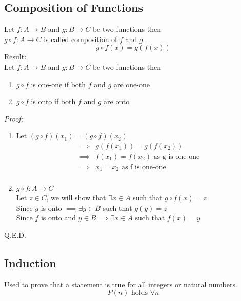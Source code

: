 \documentclass[11pt,letterpaper]{article}
\newenvironment{myproof} 
        {\textit{Proof:}}                                   
        {\begin{flushright} Q.E.D. \end{flushright}}
\begin{document}
\subsection{Composition of Functions}
Let $f:A\to B$ and $g:B\to C$ be two functions then\\
$g\circ f: A\to C$ is called composition of $f$ and $g$.
\[
  g\circ f(x) = g(f(x))
\]
Result:\\
Let $ f:A\to B$ and $g:B\to C$ be two functions then
\begin{enumerate}
  \item $g\circ f$ is one-one if both $f$ and $g$ are one-one
  \item $g\circ f$ is onto if both $f$ and $g$ are onto
\end{enumerate}
\begin{myproof}
  \begin{enumerate}
    \item Let $(g\circ f)(x_1) = (g\circ f)(x_2)$
      \begin{align*}
        \implies & g(f(x_1)) = g(f(x_2)) \\ 
        \implies & f(x_1) = f(x_2) \text{ as g is one-one}\\ 
        \implies & x_1 = x_2 \text{ as f is one-one}\\
      \end{align*}
    \item $g\circ f: A \to C$ \\
      Let $z\in C$, we will show that $\exists x\in A$ such that $g\circ f(x) = z$\\
      Since $g$ is onto $\implies \exists y\in B$ such that $g(y) = z$\\
      Since $f$ is onto and $y\in B \implies \exists x \in A \text{ such that } f(x)=y$ 
  \end{enumerate}
\end{myproof}
\subsection{Induction}
Used to prove that a statement is true for all integers or natural numbers.
\[
  P(n) \text{ holds } \forall n
\]
\end{document}
